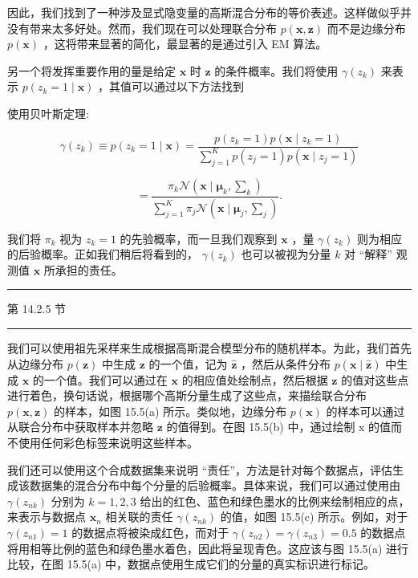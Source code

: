 \documentclass[10pt]{report}
\newcommand{\HRule}{\begin{center}\rule{0.9\linewidth}{0.2mm}\end{center}}
\begin{document}
因此，我们找到了一种涉及显式隐变量的高斯混合分布的等价表述。这样做似乎并没有带来太多好处。然而，我们现在可以处理联合分布 \(p\left( {\mathbf{x},\mathbf{z}}\right)\) 而不是边缘分布 \(p\left( \mathbf{x}\right)\) ，这将带来显著的简化，最显著的是通过引入 EM 算法。

另一个将发挥重要作用的量是给定 \(\mathbf{x}\) 时 \(\mathbf{z}\) 的条件概率。我们将使用 \(\gamma \left( {z}_{k}\right)\) 来表示 \(p\left( {{z}_{k} = 1 \mid  \mathbf{x}}\right)\) ，其值可以通过以下方法找到

使用贝叶斯定理:

\[
\gamma \left( {z}_{k}\right)  \equiv  p\left( {{z}_{k} = 1 \mid  \mathbf{x}}\right)  = \frac{p\left( {{z}_{k} = 1}\right) p\left( {\mathbf{x} \mid  {z}_{k} = 1}\right) }{\mathop{\sum }\limits_{{j = 1}}^{K}p\left( {{z}_{j} = 1}\right) p\left( {\mathbf{x} \mid  {z}_{j} = 1}\right) }
\]

\[
= \frac{{\pi }_{k}\mathcal{N}\left( {\mathbf{x} \mid  {\mathbf{\mu }}_{k},{\mathbf{\sum }}_{k}}\right) }{\mathop{\sum }\limits_{{j = 1}}^{K}{\pi }_{j}\mathcal{N}\left( {\mathbf{x} \mid  {\mathbf{\mu }}_{j},{\mathbf{\sum }}_{j}}\right) }. \tag{15.12}
\]

我们将 \({\pi }_{k}\) 视为 \({z}_{k} = 1\) 的先验概率，而一旦我们观察到 \(\mathbf{x}\) ，量 \(\gamma \left( {z}_{k}\right)\) 则为相应的后验概率。正如我们稍后将看到的， \(\gamma \left( {z}_{k}\right)\) 也可以被视为分量 \(k\) 对 “解释” 观测值 \(\mathbf{x}\) 所承担的责任。

\HRule

第 14.2.5 节

\HRule

我们可以使用祖先采样来生成根据高斯混合模型分布的随机样本。为此，我们首先从边缘分布 \(p\left( \mathbf{z}\right)\) 中生成 \(\mathbf{z}\) 的一个值，记为 \(\widehat{\mathbf{z}}\) ，然后从条件分布 \(p\left( {\mathbf{x} \mid  \widehat{\mathbf{z}}}\right)\) 中生成 \(\mathbf{x}\) 的一个值。我们可以通过在 \(\mathbf{x}\) 的相应值处绘制点，然后根据 \(\mathbf{z}\) 的值对这些点进行着色，换句话说，根据哪个高斯分量生成了这些点，来描绘联合分布 \(p\left( {\mathbf{x},\mathbf{z}}\right)\) 的样本，如图 15.5(a) 所示。类似地，边缘分布 \(p\left( \mathbf{x}\right)\) 的样本可以通过从联合分布中获取样本并忽略 \(\mathbf{z}\) 的值得到。在图 15.5(b) 中，通过绘制 \(\mathrm{x}\) 的值而不使用任何彩色标签来说明这些样本。

我们还可以使用这个合成数据集来说明 “责任”，方法是针对每个数据点，评估生成该数据集的混合分布中每个分量的后验概率。具体来说，我们可以通过使用由 \(\gamma \left( {z}_{nk}\right)\) 分别为 \(k = 1,2,3\) 给出的红色、蓝色和绿色墨水的比例来绘制相应的点，来表示与数据点 \({\mathbf{x}}_{n}\) 相关联的责任 \(\gamma \left( {z}_{nk}\right)\) 的值，如图 15.5(c) 所示。例如，对于 \(\gamma \left( {z}_{n1}\right)  = 1\) 的数据点将被染成红色，而对于 \(\gamma \left( {z}_{n2}\right)  = \gamma \left( {z}_{n3}\right)  = {0.5}\) 的数据点将用相等比例的蓝色和绿色墨水着色，因此将呈现青色。这应该与图 15.5(a) 进行比较，在图 15.5(a) 中，数据点使用生成它们的分量的真实标识进行标记。
\end{document}
